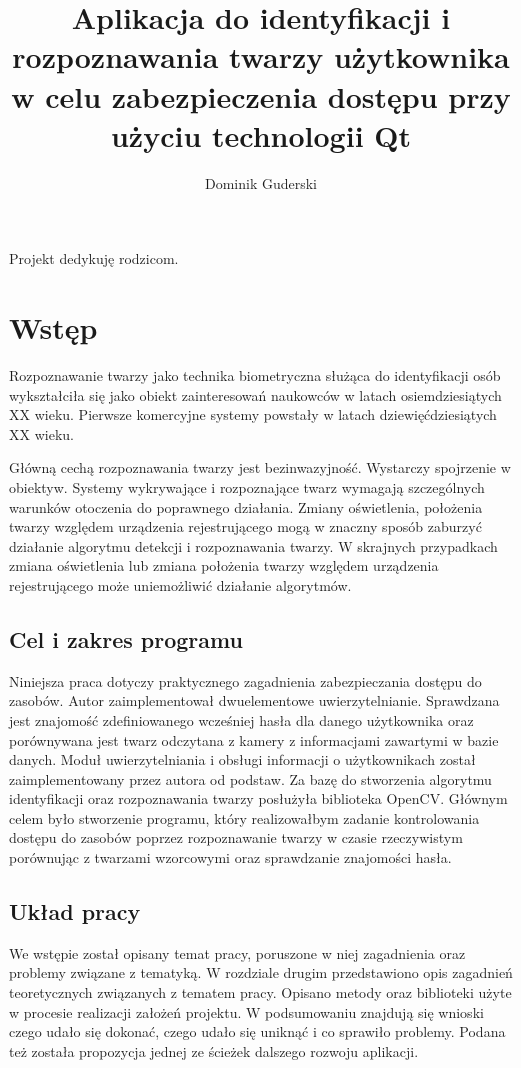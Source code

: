 \documentclass[eng,printmode]{mgr}
\title{Aplikacja do identyfikacji i rozpoznawania twarzy użytkownika w celu zabezpieczenia dostępu przy użyciu technologii Qt}
\author{Dominik Guderski}
\begin{document}


\maketitle
\dedication{6cm}{Projekt dedykuję rodzicom.}

\tableofcontents


\chapter{Wstęp}
Rozpoznawanie twarzy jako technika biometryczna służąca do identyfikacji osób wykształciła się jako obiekt zainteresowań naukowców w latach osiemdziesiątych XX wieku. Pierwsze komercyjne systemy powstały w latach dziewięćdziesiątych XX wieku.\cite{historyreco}

Główną cechą rozpoznawania twarzy jest bezinwazyjność. Wystarczy spojrzenie w obiektyw. Systemy wykrywające i rozpoznające twarz wymagają szczególnych warunków otoczenia do poprawnego działania. Zmiany oświetlenia, położenia twarzy względem urządzenia rejestrującego mogą w znaczny sposób zaburzyć działanie algorytmu detekcji i rozpoznawania twarzy. W skrajnych przypadkach zmiana oświetlenia lub zmiana położenia twarzy względem urządzenia rejestrującego może uniemożliwić działanie algorytmów.
\section{Cel i zakres programu}

Niniejsza praca dotyczy praktycznego zagadnienia zabezpieczania dostępu do zasobów. Autor zaimplementował dwuelementowe uwierzytelnianie. Sprawdzana jest znajomość zdefiniowanego wcześniej hasła dla danego użytkownika oraz porównywana jest twarz odczytana z kamery z informacjami zawartymi w bazie danych. Moduł uwierzytelniania i obsługi informacji o użytkownikach został zaimplementowany przez autora od podstaw. Za bazę do stworzenia algorytmu identyfikacji oraz rozpoznawania twarzy posłużyła biblioteka OpenCV. Głównym celem było stworzenie programu, który realizowałbym zadanie kontrolowania dostępu do zasobów poprzez rozpoznawanie twarzy w czasie rzeczywistym porównując z twarzami wzorcowymi oraz sprawdzanie znajomości hasła.

\section{Układ pracy}

We wstępie został opisany temat pracy, poruszone w niej zagadnienia oraz problemy związane z tematyką. W rozdziale drugim przedstawiono opis zagadnień teoretycznych związanych z tematem pracy. Opisano metody oraz biblioteki użyte w procesie realizacji założeń projektu. W podsumowaniu znajdują się wnioski czego udało się dokonać, czego udało się uniknąć i co sprawiło problemy. Podana też została propozycja jednej ze ścieżek dalszego rozwoju aplikacji.
\end{document}
